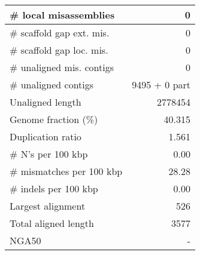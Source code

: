 \documentclass[12pt,a4paper]{article}
\begin{document}
\begin{table}[ht]
\begin{center}
\begin{tabular}{|l*{1}{|r}|}
\# local misassemblies & 0 \\ \hline
\# scaffold gap ext. mis. & 0 \\ \hline
\# scaffold gap loc. mis. & 0 \\ \hline
\# unaligned mis. contigs & 0 \\ \hline
\# unaligned contigs & 9495 + 0 part \\ \hline
Unaligned length & 2778454 \\ \hline
Genome fraction (\%) & 40.315 \\ \hline
Duplication ratio & 1.561 \\ \hline
\# N's per 100 kbp & 0.00 \\ \hline
\# mismatches per 100 kbp & 28.28 \\ \hline
\# indels per 100 kbp & 0.00 \\ \hline
Largest alignment & 526 \\ \hline
Total aligned length & 3577 \\ \hline
NGA50 & - \\ \hline
\end{tabular}
\end{center}
\end{table}
\end{document}
